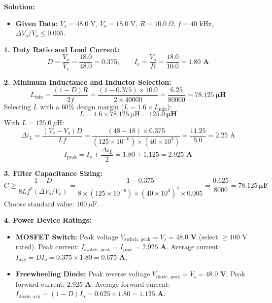 \documentclass[10pt,a4paper]{article}
\begin{document}
\vspace{1mm}
\noindent\textbf{\textcolor{accentteal}{Solution:}}
\begin{itemize}
  \item \textbf{Given Data:} $V_s = 48.0\text{ V}$, $V_o = 18.0\text{ V}$, $R = 10.0\ \Omega$, $f = 40\text{ kHz}$, $\Delta V_o / V_o \le 0.005$.
\end{itemize}

\noindent\textbf{1. Duty Ratio and Load Current:}\\
\[
D = \frac{V_o}{V_s} = \frac{18.0}{48.0} = \mathbf{0.375}, \qquad I_o = \frac{V_o}{R} = \frac{18.0}{10.0} = \mathbf{1.80\text{ A}}
\]

\noindent\textbf{2. Minimum Inductance and Inductor Selection:}\\
\[
L_{\min} = \frac{(1 - D) R}{2 f} = \frac{(1 - 0.375) \times 10.0}{2 \times 40000} = \frac{6.25}{80000} = \mathbf{78.125\ \mu\text{H}}
\]
Selecting $L$ with a $60\%$ design margin ($L = 1.6 \times L_{\min}$):
\[
L = 1.6 \times 78.125\ \mu\text{H} = \mathbf{125.0\ \mu\text{H}}
\]
With $L = 125.0\ \mu\text{H}$:
\[
\Delta i_L = \frac{(V_s - V_o) D}{L f} = \frac{(48 - 18) \times 0.375}{(125 \times 10^{-6}) \times (40 \times 10^3)} = \frac{11.25}{5.0} = 2.25\text{ A}
\]
\[
I_{\text{peak}} = I_o + \frac{\Delta i_L}{2} = 1.80 + 1.125 = \mathbf{2.925\text{ A}}
\]

\noindent\textbf{3. Filter Capacitance Sizing:}\\
\[
C \ge \frac{1 - D}{8 L f^2 (\Delta V_o / V_o)} = \frac{1 - 0.375}{8 \times (125 \times 10^{-6}) \times (40 \times 10^3)^2 \times 0.005} = \frac{0.625}{8000} = \mathbf{78.125\ \mu\text{F}}
\]
Choose standard value: \textbf{$100\ \mu\text{F}$}.

\noindent\textbf{4. Power Device Ratings:}\\
\begin{itemize}
  \item \textbf{MOSFET Switch:} Peak voltage $V_{\text{switch, peak}} = V_s = \mathbf{48.0\text{ V}}$ (select $\ge 100\text{ V}$ rated). Peak current: $I_{\text{switch, peak}} = I_{\text{peak}} = \mathbf{2.925\text{ A}}$. Average current: $I_{\text{avg}} = D I_o = 0.375 \times 1.80 = \mathbf{0.675\text{ A}}$.
  \item \textbf{Freewheeling Diode:} Peak reverse voltage $V_{\text{diode, peak}} = V_s = \mathbf{48.0\text{ V}}$. Peak forward current: $\mathbf{2.925\text{ A}}$. Average forward current: $I_{\text{diode, avg}} = (1 - D) I_o = 0.625 \times 1.80 = \mathbf{1.125\text{ A}}$.
\end{itemize}
\end{document}

